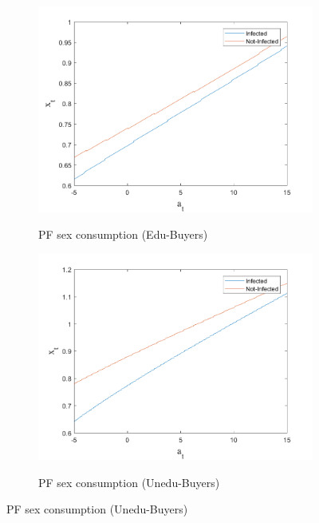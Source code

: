 \begin{figure}[H]\caption{Maturity and diffusion, continuation}
\begin{subfigure}{0.5\textwidth}\caption{PF sex consumption (Edu-Buyers)}
   \includegraphics[width=\linewidth,height = 0.22\textheight]{figures/matu/FIG9.png}
    \label{stage_3fig_1}
\end{subfigure}
\hspace*{\fill}
\begin{subfigure}{0.5\textwidth}\caption{PF sex consumption (Unedu-Buyers)}
   \includegraphics[width=\linewidth,height = 0.22\textheight]{figures/matu/FIG10.png}
    \label{stage_3fig_2}
\end{subfigure}

\end{figure}
